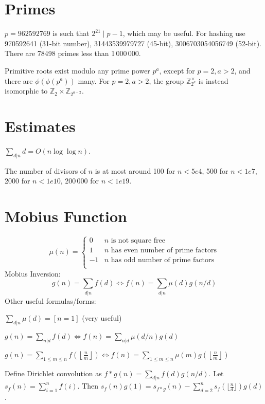 \section{Primes}
	$p=962592769$ is such that $2^{21} \mid p-1$, which may be useful. For hashing
	use 970592641 (31-bit number), 31443539979727 (45-bit), 3006703054056749
	(52-bit). There are 78498 primes less than 1\,000\,000.

	Primitive roots exist modulo any prime power $p^a$, except for $p = 2, a > 2$, and there are $\phi(\phi(p^a))$ many.
	For $p = 2, a > 2$, the group $\mathbb Z_{2^a}^\times$ is instead isomorphic to $\mathbb Z_2 \times \mathbb Z_{2^{a-2}}$.

\section{Estimates}
	$\sum_{d|n} d = O(n \log \log n)$.

	The number of divisors of $n$ is at most around 100 for $n < 5e4$, 500 for $n < 1e7$, 2000 for $n < 1e10$, 200\,000 for $n < 1e19$.

\section{Mobius Function}
\[
	\mu(n) = \begin{cases} 0 & n \textrm{ is not square free}\\ 1 & n \textrm{ has even number of prime factors}\\ -1 & n \textrm{ has odd number of prime factors}\\\end{cases}
\]
  Mobius Inversion:
  \[ g(n) = \sum_{d|n} f(d) \Leftrightarrow f(n) = \sum_{d|n} \mu(d)g(n/d) \]
  Other useful formulas/forms:

  $ \sum_{d | n} \mu(d) = [ n = 1] $ (very useful)

  $ g(n) = \sum_{n|d} f(d) \Leftrightarrow f(n) = \sum_{n|d} \mu(d/n)g(d)$

 $ g(n) = \sum_{1 \leq m \leq n} f(\left\lfloor\frac{n}{m}\right \rfloor ) \Leftrightarrow f(n) = \sum_{1\leq m\leq n} \mu(m)g(\left\lfloor\frac{n}{m}\right\rfloor)$

Define Dirichlet convolution as $f * g(n) = \sum_{d|n}f(d)g(n/d)$.
Let $s_f(n) = \sum_{i=1}^n{f(i)}$.
Then $s_f(n)g(1) = s_{f*g}(n) - \sum^n_{d=2}s_f(\lfloor \frac{n}{d} \rfloor) g(d)$.
